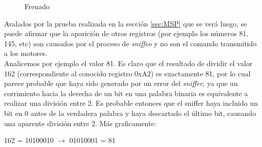 \documentclass[main]{subfiles}
\begin{document}
\begin{figure} [h!]
\centering
  \caption{Frenado}
  \label{fig:frenado}
\end{figure}

Avalados por la prueba realizada en la secci\'on \ref{sec:MSP} que se ver\'a luego, se puede afirmar que la aparici\'on de otros registros (por ejemplo los n\'umeros 81, 145, etc) son causados por el proceso de \emph{sniffeo} y no son el comando transmitido a los motores.\\

Analicemos por ejemplo el valor 81. Es claro que el resultado de dividir el valor 162 (correspondiente al conocido registro 0xA2) es exactamente 81, por lo cual parece probable que haya sido generado por un error del \emph{sniffer}, ya que un corrimiento hacia la derecha de un bit en una palabra binaria es equivalente a realizar una divisi\'on entre 2. Es probable entonces que el sniffer haya incluido un bit en 0 antes de la verdadera palabra y haya descartado el \'ultimo bit, causando una aparente divisi\'on entre 2. M\'as graficamente:\\

\begin{center} 162 = 10100010 $\rightarrow$ \color{green}0\color{black}1010001\color{red}\color{black} = 81\\
\end{center}
\end{document}
